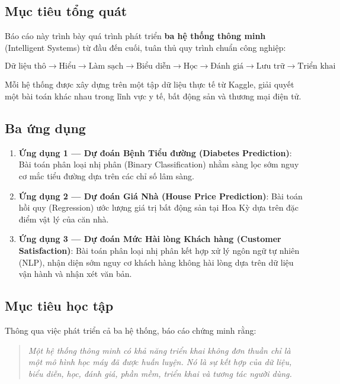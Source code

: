 \documentclass[12pt, a4paper]{article}
\begin{document}
\subsection{Mục tiêu tổng quát}

Báo cáo này trình bày quá trình phát triển \textbf{ba hệ thống thông minh} (Intelligent Systems) từ đầu đến cuối, tuân thủ quy trình chuẩn công nghiệp:

$$\text{Dữ liệu thô} \rightarrow \text{Hiểu} \rightarrow \text{Làm sạch} \rightarrow \text{Biểu diễn} \rightarrow \text{Học} \rightarrow \text{Đánh giá} \rightarrow \text{Lưu trữ} \rightarrow \text{Triển khai}$$

Mỗi hệ thống được xây dựng trên một tập dữ liệu thực tế từ Kaggle, giải quyết một bài toán khác nhau trong lĩnh vực y tế, bất động sản và thương mại điện tử.

\subsection{Ba ứng dụng}

\begin{enumerate}
    \item \textbf{Ứng dụng 1 — Dự đoán Bệnh Tiểu đường (Diabetes Prediction)}: Bài toán phân loại nhị phân (Binary Classification) nhằm sàng lọc sớm nguy cơ mắc tiểu đường dựa trên các chỉ số lâm sàng.
    \item \textbf{Ứng dụng 2 — Dự đoán Giá Nhà (House Price Prediction)}: Bài toán hồi quy (Regression) ước lượng giá trị bất động sản tại Hoa Kỳ dựa trên đặc điểm vật lý của căn nhà.
    \item \textbf{Ứng dụng 3 — Dự đoán Mức Hài lòng Khách hàng (Customer Satisfaction)}: Bài toán phân loại nhị phân kết hợp xử lý ngôn ngữ tự nhiên (NLP), nhận diện sớm nguy cơ khách hàng không hài lòng dựa trên dữ liệu vận hành và nhận xét văn bản.
\end{enumerate}

\subsection{Mục tiêu học tập}

Thông qua việc phát triển cả ba hệ thống, báo cáo chứng minh rằng:

\begin{quote}
\textit{Một hệ thống thông minh có khả năng triển khai không đơn thuần chỉ là một mô hình học máy đã được huấn luyện. Nó là sự kết hợp của dữ liệu, biểu diễn, học, đánh giá, phần mềm, triển khai và tương tác người dùng.}
\end{quote}
\end{document}
